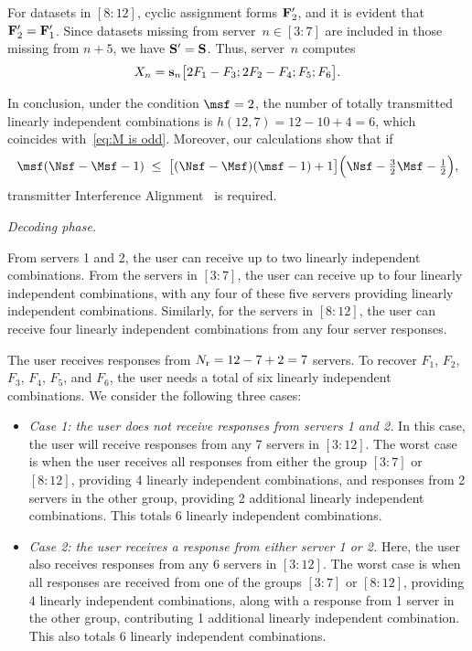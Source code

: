 \documentclass[conference,letterpaper]{IEEEtran}
\begin{document}
\begin{example}
For datasets in \([8{:}12]\), cyclic assignment forms \({\bf F}'_2\), and it is evident that \({\bf F}'_2 = {\bf F}'_1\). Since datasets missing from server~\(n \in [3{:}7]\) are included in those missing from \(n+5\), we have \({\bf S}' = {\bf S}\). Thus, server~\(n\) computes
\[
X_n = {\bf s}_n \bigl[2F_1 - F_3; 2F_2 - F_4; F_5; F_6\bigr].
\]
 


In conclusion, under the condition $\msf = 2$, the number of totally transmitted linearly independent combinations is $h(12,7) = 12 - 10 + 4 = 6$, which coincides with~\eqref{eq:M is odd}. Moreover, our calculations show that if
\[
\msf(\Nsf - \Msf - 1) \;\leq\; \bigl[(\Nsf - \Msf)(\msf - 1) + 1\bigr]\Bigl(\Nsf - \tfrac{3}{2}\Msf - \tfrac{1}{2}\Bigr),
\]
transmitter Interference Alignment~\cite{2008Interference_Alignment, MIMO_interference_channel, huang2023ISITversion} is required.
  



\iffalse
{\it Decoding phase.}

From servers 1 and 2, the user can receive up to two linearly independent combinations. From the servers in $[3:7]$, the user can receive up to four linearly independent combinations, with any four of these five servers providing linearly independent combinations. Similarly, for the servers in $[8:12]$, the user can receive four linearly independent combinations from any four server responses.

The user receives responses from $N_{\rm r} = 12 - 7 + 2 = 7$ servers.
To recover $F_1$, $F_2$, $F_3$, $F_4$, $F_5$, and $F_6$, the user needs a total of six linearly independent combinations. We consider the following three cases:
\begin{itemize}
\item {\it Case 1: the user does not receive responses from servers 1 and 2.} In this case, the user will receive responses from any 7 servers in $[3:12]$. The worst case is when the user receives all responses from either the group $[3:7]$ or $[8:12]$, providing 4 linearly independent combinations, and responses from 2 servers in the other group, providing 2 additional linearly independent combinations. This totals 6 linearly independent combinations.

\item {\it Case 2: the user receives a response from either server 1 or 2.} Here, the user also receives responses from any 6 servers in $[3:12]$. The worst case is when all responses are received from one of the groups $[3:7]$ or $[8:12]$, providing 4 linearly independent combinations, along with a response from 1 server in the other group, contributing 1 additional linearly independent combination. This also totals 6 linearly independent combinations.


\end{itemize}
\end{example}
\end{document}

